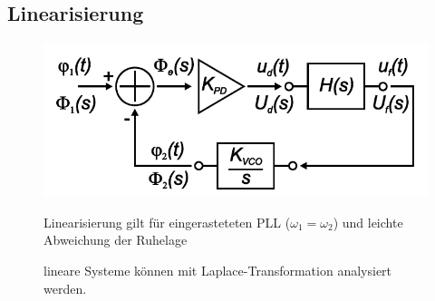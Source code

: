 \subsection{Linearisierung}
\begin{figure}[h!]
	\begin{minipage}{0.3\textwidth} 
       \includegraphics[width=1\textwidth]{images/linear_PLL}
	\end{minipage}
	\begin{minipage}{0.7\textwidth} 
       \begin{compactitem}
          \item Linearisierung gilt für eingerasteteten PLL ($\omega_1 = \omega_2$) und leichte Abweichung der Ruhelage
          \item lineare Systeme können mit Laplace-Transformation analysiert werden.
       \end{compactitem}
	\end{minipage}
\end{figure}

\FloatBarrier
